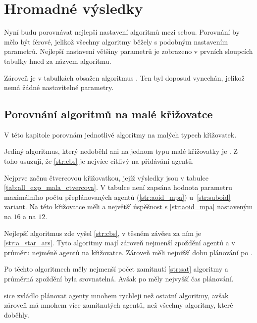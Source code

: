 \section{Hromadné výsledky}\label{sec:hromadne_vysledky}

%

Nyní budu porovnávat nejlepší nastavení algoritmů mezi sebou.
Porovnání by mělo být férové, jelikož všechny algoritmy běžely s podobným nastavením parametrů.
Nejlepší nastavení většiny parametrů je zobrazeno v prvních sloupcích tabulky hned za názvem algoritmu.

Zároveň je v tabulkách obsažen algoritmus .
Ten byl doposud vynechán, jelikož nemá žádné nastavitelné parametry.

\subsection{Porovnání algoritmů na malé křižovatce}\label{subsec:porovnani_algoritmu_na_male_krizovatce}

V této kapitole porovnám jednotlivé algoritmy na malých typech křižovatek.

Jediný algoritmus, který nedoběhl ani na jednom typu malé křižovatky je .
Z toho usuzuji, že \ref{str:cbs} je nejvíce citlivý na přidávání agentů.


Nejprve začnu čtvercovou křižovatkou, jejíž výsledky jsou v tabulce \ref{tab:all_exp_mala_ctvercova}.
V tabulce není zapsána hodnota parametru maximálního počtu přeplánovaných agentů (\ref{str:aoid_mpa}) u~\ref{str:suboid} variant.
Na této křižovatce měli  a 
největší úspěšnost s \ref{str:aoid_mpa} nastaveným na $16$ a  na $12$.

Nejlepší algoritmus zde vyšel \ref{str:cbs}, v těsném závěsu za ním je \ref{str:a_star_ars}.
Tyto algoritmy mají zároveň nejmenší zpoždění agentů a v průměru nejméně agentů na křižovatce.
Zároveň měli nejnižší dobu plánování po .

Po těchto algoritmech měly nejmenší počet zamítnutí \ref{str:sat} algoritmy a průměrná zpoždění byla srovnatelná.
Avšak po  měly nejvyšší čas plánování.

 sice zvládlo plánovat agenty mnohem rychleji než ostatní algoritmy,
avšak zároveň má mnohem více zamítnutých agentů, než všechny algoritmy, které doběhly.


